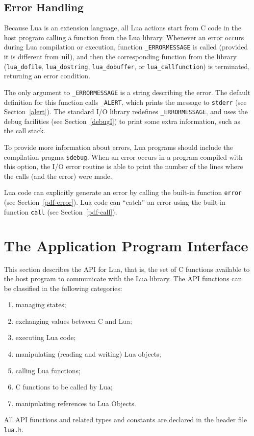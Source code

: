 \documentclass[11pt]{article}
\newcommand{\See}[1]{Section~\ref{#1}}
\newcommand{\see}[1]{(see \See{#1})}
\newcommand{\nil}{{\bf nil}}
\newcommand{\Deffunc}[1]{\index{#1}}
\begin{document}
\subsection{Error Handling} \label{error}

Because Lua is an extension language,
all Lua actions start from C code in the host program
calling a function from the Lua library.
Whenever an error occurs during Lua compilation or execution,
function \verb|_ERRORMESSAGE| is called \Deffunc{_ERRORMESSAGE}
(provided it is different from \nil),
and then the corresponding function from the library
(\verb|lua_dofile|, \verb|lua_dostring|,
\verb|lua_dobuffer|, or \verb|lua_callfunction|)
is terminated, returning an error condition.

The only argument to \verb|_ERRORMESSAGE| is a string
describing the error.
The default definition for this function calls \verb|_ALERT|,
which prints the message to \verb|stderr| \see{alert}.
The standard I/O library redefines \verb|_ERRORMESSAGE|,
and uses the debug facilities \see{debugI}
to print some extra information,
such as the call stack.

To provide more information about errors,
Lua programs should include the compilation pragma \verb|$debug|.
\label{pragma}
When an error occurs in a program compiled with this option,
the I/O error routine is able to print the number of the
lines where the calls (and the error) were made.

Lua code can explicitly generate an error by calling the built-in
function \verb|error| \see{pdf-error}.
Lua code can ``catch'' an error using the built-in function
\verb|call| \see{pdf-call}.



\section{The Application Program Interface}

This section describes the API for Lua, that is,
the set of C functions available to the host program to communicate
with the Lua library.
The API functions can be classified in the following categories:
\begin{enumerate}
\item managing states;
\item exchanging values between C and Lua;
\item executing Lua code;
\item manipulating (reading and writing) Lua objects;
\item calling Lua functions;
\item C functions to be called by Lua;
\item manipulating references to Lua Objects.
\end{enumerate}
All API functions and related types and constants
are declared in the header file \verb|lua.h|.
\end{document}

